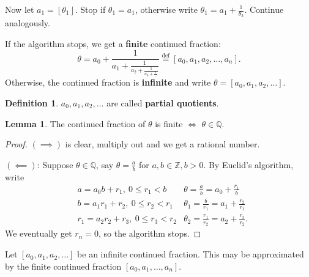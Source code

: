 \documentclass{article}
\theoremstyle{definition}
\newtheorem{lemma}[theorem]{Lemma}
\newtheorem{defn}{Definition}[section]
\begin{document}
Now let $a_1 = \left\lfloor \theta_1 \right\rfloor$. Stop if $\theta_1=a_1$, otherwise write $\theta_1 = a_1 + \frac{1}{\theta_2}$. Continue analogously.
\vspace{1mm}

If the algorithm stops, we get a \textbf{finite} continued fraction:
\[
\theta = a_0 + \frac{1}{a_1+\frac{1}{a_2+\frac{1}{a_3+\frac{1}{\ldots}}}} \stackrel{\text{def}}{=} [a_0,a_1,a_2,\ldots,a_n]. 
\]
Otherwise, the continued fraction is \textbf{infinite} and write $\theta = [a_0,a_1,a_2,\ldots]$.
\begin{defn}
    $a_0,a_1,a_2,\ldots$ are called \textbf{partial quotients}.     
\end{defn}
\begin{lemma}
    The continued fraction of $\theta$ is finite $\iff$ $\theta \in \mathbb{Q}$.
\end{lemma}
\begin{proof}
    $(\implies)$ is clear, multiply out and we get a rational number.
    \vspace{1mm}
    
    $(\impliedby)$: Suppose $\theta \in \mathbb{Q}$, say $\theta=\frac{a}{b}$ for $a,b \in \mathbb{Z}, b>0$. By Euclid's algorithm, write 
    \begin{align*}
        &a=a_0b+r_1,~ 0\le r_1<b  &\theta=\frac{a}{b}=a_0+\frac{r_1}{b}\\
        &b=a_1r_1+r_2,~ 0\le r_2<r_1 &\theta_1 = \frac{b}{r_1}=a_1+\frac{r_2}{r_1}\\
        &r_1=a_2r_2+r_3, ~0\le r_3<r_2 &\theta_2 = \frac{r_1}{r_2}=a_2+\frac{r_3}{r_2}.
    \end{align*}
    We eventually get $r_n=0$, so the algorithm stops.
\end{proof}
Let $[a_0,a_1,a_2,\ldots]$ be an infinite continued fraction. This may be approximated by the finite continued fraction $[a_0,a_1,\ldots,a_n]$.
\vspace{1mm}
\end{document}

